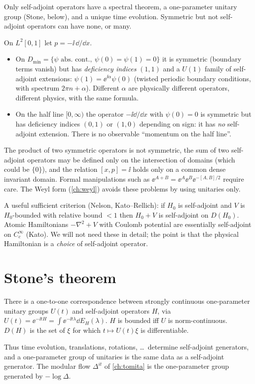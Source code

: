 Only self-adjoint operators have a spectral theorem, a one-parameter unitary group (Stone, below), and a unique time evolution. Symmetric but not self-adjoint operators can have none, or many.

\begin{example}\label{ex:interval}
On $L^2[0,1]$ let $p=-\ii\,\dd/\dd x$.
\begin{itemize}
\item On $D_{\min}=\{\psi\text{ abs.\ cont.},\ \psi(0)=\psi(1)=0\}$ it is symmetric (boundary terms vanish) but has \emph{deficiency indices} $(1,1)$ and a $U(1)$ family of self-adjoint extensions: $\psi(1)=\ee^{\ii\alpha}\psi(0)$ (twisted periodic boundary conditions, with spectrum $2\pi n+\alpha$). Different $\alpha$ are physically different operators, different physics, with the same formula.
\item On the half line $[0,\infty)$ the operator $-\ii\dd/\dd x$ with $\psi(0)=0$ is symmetric but has deficiency indices $(0,1)$ or $(1,0)$ depending on sign: it has \emph{no} self-adjoint extension. There is no observable ``momentum on the half line''.
\end{itemize}
\end{example}

\begin{whatwrong}
The product of two symmetric operators is not symmetric, the sum of two self-adjoint operators may be defined only on the intersection of domains (which could be $\{0\}$), and the relation $[x,p]=\ii$ holds only on a common dense invariant domain. Formal manipulations such as $\ee^{A+B}=\ee^A\ee^B\ee^{-[A,B]/2}$ require care. The Weyl form (\cref{ch:weyl}) avoids these problems by using unitaries only.
\end{whatwrong}

A useful sufficient criterion (Nelson, Kato--Rellich): if $H_0$ is self-adjoint and $V$ is $H_0$-bounded with relative bound $<1$ then $H_0+V$ is self-adjoint on $D(H_0)$. Atomic Hamiltonians $-\nabla^2+V$ with Coulomb potential are essentially self-adjoint on $C_c^\infty$ (Kato). We will not need these in detail; the point is that the physical Hamiltonian is a \emph{choice} of self-adjoint operator.

\section{Stone's theorem}

\begin{theorem}[Stone]
There is a one-to-one correspondence between strongly continuous one-parameter unitary groups $U(t)$ and self-adjoint operators $H$, via $U(t)=\ee^{-\ii tH}=\int\ee^{-\ii t\lambda}\dd E_H(\lambda)$. $H$ is bounded iff $U$ is norm-continuous. $D(H)$ is the set of $\xi$ for which $t\mapsto U(t)\xi$ is differentiable.
\end{theorem}
Thus time evolution, translations, rotations, \dots\ determine self-adjoint generators, and a one-parameter group of unitaries is the same data as a self-adjoint generator. The modular flow $\Delta^{it}$ of \cref{ch:tomita} is the one-parameter group generated by $-\log\Delta$.

